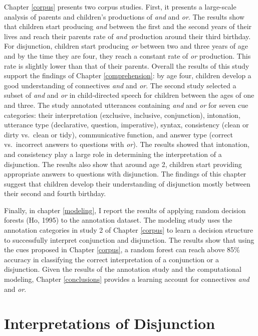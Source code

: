 \documentclass[oneside]{report}
\theoremstyle{definition}
\theoremstyle{definition}
\theoremstyle{definition}
\theoremstyle{remark}
\begin{document}
Chapter \ref{corpus} presents two corpus studies. First, it presents a
large-scale analysis of parents and children's productions of \emph{and}
and \emph{or}. The results show that children start producing \emph{and}
between the first and the second years of their lives and reach their
parents rate of \emph{and} production around their third birthday. For
disjunction, children start producing \emph{or} between two and three
years of age and by the time they are four, they reach a constant rate
of \emph{or} production. This rate is slightly lower than that of their
parents. Overall the results of this study support the findings of
Chapter \ref{comprehension}: by age four, children develop a good
understanding of connectives \emph{and} and \emph{or}. The second study
selected a subset of \emph{and} and \emph{or} in child-directed speech
for children between the ages of one and three. The study annotated
utterances containing \emph{and} and \emph{or} for seven cue categories:
their interpretation (exclusive, inclusive, conjunction), intonation,
utterance type (declarative, question, imperative), syntax, consistency
(clean or dirty vs.~clean or tidy), communicative function, and answer
type (correct vs.~incorrect answers to questions with \emph{or}). The
results showed that intonation, and consistency play a large role in
determining the interpretation of a disjunction. The results also show
that around age 2, children start providing appropriate answers to
questions with disjunction. The findings of this chapter suggest that
children develop their understanding of disjunction mostly between their
second and fourth birthday.

Finally, in chapter \ref{modeling}, I report the results of applying
random decision forests (Ho, 1995) to the annotation dataset. The
modeling study uses the annotation categories in study 2 of Chapter
\ref{corpus} to learn a decision structure to successfully interpret
conjunction and disjunction. The results show that using the cues
proposed in Chapter \ref{corpus}, a random forest can reach above 85\%
accuracy in classifying the correct interpretation of a conjunction or a
disjunction. Given the results of the annotation study and the
computational modeling, Chapter \ref{conclusions} provides a learning
account for connectives \emph{and} and \emph{or}.

\chapter{Interpretations of Disjunction}\label{sempragLit}
\end{document}
